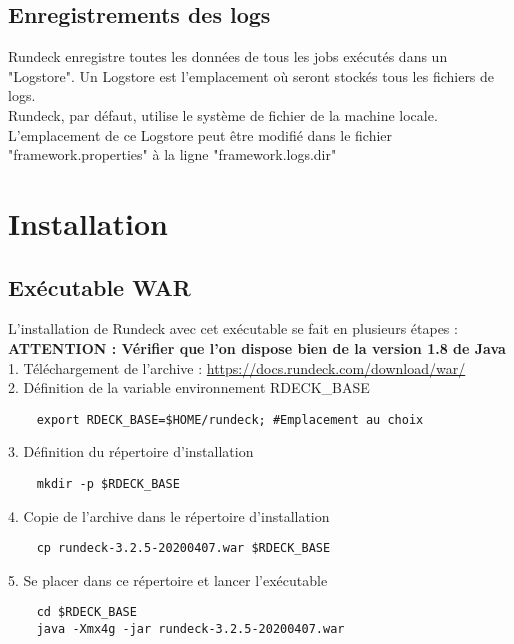\documentclass[12pt]{article}
\begin{document}
\subsection{Enregistrements des logs}
Rundeck enregistre toutes les données de tous les jobs exécutés dans un "Logstore".
Un Logstore est l'emplacement où seront stockés tous les fichiers de logs.
\\
Rundeck, par défaut, utilise le système de fichier de la machine locale.
\\
L'emplacement de ce Logstore peut être modifié dans le fichier "framework.properties" à la ligne "framework.logs.dir"

\newpage

\section{Installation}
\subsection{Exécutable WAR}
L'installation de Rundeck avec cet exécutable se fait en plusieurs étapes :
\\
\textbf{ATTENTION : Vérifier que l'on dispose bien de la version 1.8 de Java}
\vspace{0.5cm}
\\
1. Téléchargement de l'archive : \url{https://docs.rundeck.com/download/war/}
\vspace{0.3cm}
\\
2. Définition  de la variable environnement RDECK\_BASE
\begin{lstlisting}
    export RDECK_BASE=$HOME/rundeck; #Emplacement au choix
\end{lstlisting}

3. Définition du répertoire d'installation
\begin{lstlisting}
    mkdir -p $RDECK_BASE
\end{lstlisting}

4. Copie de l'archive dans le répertoire d'installation
\begin{lstlisting}
    cp rundeck-3.2.5-20200407.war $RDECK_BASE
\end{lstlisting}

5. Se placer dans ce répertoire et lancer l'exécutable
\begin{lstlisting}
    cd $RDECK_BASE
    java -Xmx4g -jar rundeck-3.2.5-20200407.war
\end{lstlisting}
\end{document}
